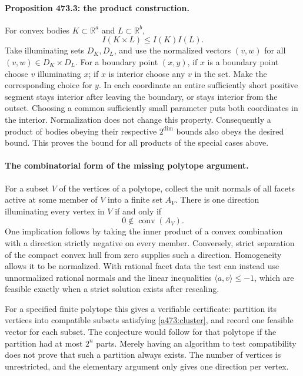 \documentclass[11pt]{article}
\begin{document}
\paragraph{Proposition 473.3: the product construction.}
For convex bodies $K\subset\mathbb R^a$ and $L\subset\mathbb R^b$,
\begin{equation}\label{a473:product}
                           I(K\times L)\leq I(K)I(L).
\end{equation}
Take illuminating sets $D_K,D_L$, and use the normalized vectors $(v,w)$ for all $(v,w)\in D_K\times D_L$. For a boundary point $(x,y)$, if $x$ is a boundary point choose $v$ illuminating $x$; if $x$ is interior choose any $v$ in the set. Make the corresponding choice for $y$. In each coordinate an entire sufficiently short positive segment stays interior after leaving the boundary, or stays interior from the outset. Choosing a common sufficiently small parameter puts both coordinates in the interior. Normalization does not change this property. Consequently a product of bodies obeying their respective $2^{\dim}$ bounds also obeys the desired bound. This proves the bound for all products of the special cases above.

\paragraph{The combinatorial form of the missing polytope argument.}
For a subset $V$ of the vertices of a polytope, collect the unit normals of all facets active at some member of $V$ into a finite set $A_V$. There is one direction illuminating every vertex in $V$ if and only if
\begin{equation}\label{a473:cluster}
                          0\notin\operatorname{conv}(A_V).
\end{equation}
One implication follows by taking the inner product of a convex combination with a direction strictly negative on every member. Conversely, strict separation of the compact convex hull from zero supplies such a direction. Homogeneity allows it to be normalized. With rational facet data the test can instead use unnormalized rational normals and the linear inequalities $\langle a,v\rangle\leq-1$, which are feasible exactly when a strict solution exists after rescaling.

For a specified finite polytope this gives a verifiable certificate: partition its vertices into compatible subsets satisfying \eqref{a473:cluster}, and record one feasible vector for each subset. The conjecture would follow for that polytope if the partition had at most $2^n$ parts. Merely having an algorithm to test compatibility does not prove that such a partition always exists. The number of vertices is unrestricted, and the elementary argument only gives one direction per vertex.
\end{document}
